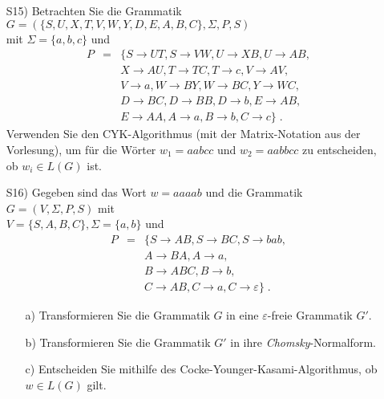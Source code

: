 
\begin{exercise}
	\begin{enumerate}
\item[S15)] Betrachten Sie die Grammatik $G=(\{ S,U,X,T,V,W,Y,D,E,A,B,C\},\Sigma, P,S)$ \\mit
  $\Sigma=\{a,b,c\}$ und
\begin{eqnarray*}
P&=&\{
      S\longrightarrow UT,  S\longrightarrow VW,
      U\longrightarrow XB, U\longrightarrow AB,\\
&&
      X \longrightarrow AU,
      T \longrightarrow TC, T \longrightarrow c,
      V \longrightarrow AV,\\
&&V \longrightarrow a,
      W \longrightarrow BY, W \longrightarrow BC,
      Y \longrightarrow WC,\\
&&    D \longrightarrow BC, D \longrightarrow BB, D \longrightarrow  b,
      E \longrightarrow AB,\\
&&  E \longrightarrow AA,
      A\longrightarrow a,
      B\longrightarrow b,
      C\longrightarrow c\}\;.
\end{eqnarray*}
   Verwenden Sie den CYK-Algorithmus (mit der Matrix-Notation aus der
    Vorlesung), um f\"ur die W\"orter $w_1 = aabcc$ und $w_2 = aabbcc$ zu entscheiden, ob
    $w_i\in L(G)$ ist.\\

\item[S16)] Gegeben sind das Wort $w=aaaab$ und die Grammatik $G=(V,\Sigma ,P,S)$ mit\\
$V=\{S,A,B,C\}, \Sigma =\{a,b\}$ und
\begin{eqnarray*}
P&=&\{ S\longrightarrow AB, S\longrightarrow BC, S\longrightarrow bab,\\
&& A\longrightarrow BA, A\longrightarrow a,\\
&& B\longrightarrow ABC, B\longrightarrow b,\\
&& C\longrightarrow AB, C\longrightarrow a, C\longrightarrow \varepsilon\}\;.
\end{eqnarray*}

\begin{enumerate}
\item[a)] Transformieren Sie die Grammatik $G$ in eine $\varepsilon$-freie Grammatik $G'$.
\item[b)] Transformieren Sie die Grammatik $G'$ in ihre {\it
    Chomsky}-Normalform.
\item[c)] Entscheiden Sie mithilfe des
  Cocke-Younger-Kasami-Algorithmus, ob $w\in L(G)$
  gilt.
\end{enumerate}
\end{enumerate}

\end{exercise}
